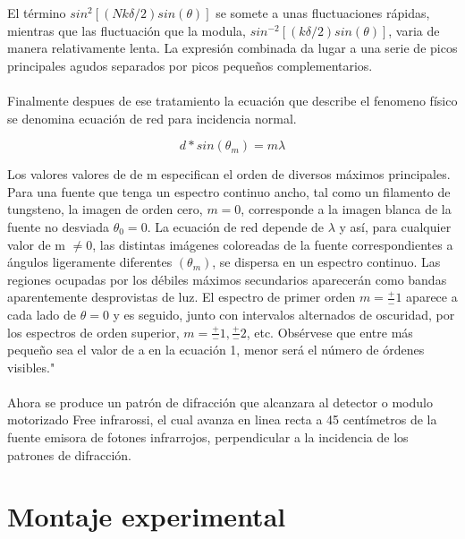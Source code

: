 \documentclass[12]{article}
\begin{document}
\begin{multicols}{2}
El término $sin^{2}[(Nk\delta/2)sin(\theta)]$ se somete a unas fluctuaciones rápidas, mientras que las fluctuación que la modula, $sin^{-2}[(k\delta/2)sin(\theta)]$, varia de manera relativamente lenta. La expresión combinada da lugar a una serie de picos principales agudos separados por picos pequeños complementarios.\\ \\

Finalmente despues de ese tratamiento la ecuación que describe el fenomeno físico se denomina ecuación de red para incidencia normal. 

\begin{equation}
d*sin(\theta _m)= m\lambda 
\end{equation}


Los valores valores de de m especifican el orden de diversos máximos principales. Para una fuente que tenga un espectro continuo ancho, tal como un filamento de tungsteno, la imagen de orden cero, $ m = 0 $, corresponde a la imagen blanca de la fuente no desviada $ \theta _0 = 0 $. La ecuación de red depende de $\lambda$ y así, para cualquier valor de m $\ne  0$, las distintas imágenes coloreadas de la fuente correspondientes a ángulos ligeramente diferentes $(\theta _m)$, se dispersa en un espectro continuo. Las regiones ocupadas por los débiles máximos secundarios aparecerán como bandas aparentemente desprovistas de luz. El espectro de primer orden $m = \frac{+}{-}1$ aparece a cada lado de $\theta = 0$ y es seguido, junto con intervalos alternados de oscuridad, por los espectros de orden superior, $m = \frac{+}{-}1, \frac{+}{-}2$, etc. Obsérvese que entre más pequeño sea el valor de a en la ecuación 1, menor será el número de órdenes visibles."\cite{OPTICA} \\ \\

Ahora se produce un patrón de difracción que alcanzara al detector o modulo motorizado Free infrarossi, el cual avanza en linea recta a 45 centímetros de la fuente emisora de fotones infrarrojos, perpendicular a la incidencia de los patrones de difracción.



\section{Montaje experimental}

\end{multicols}
\end{document}
